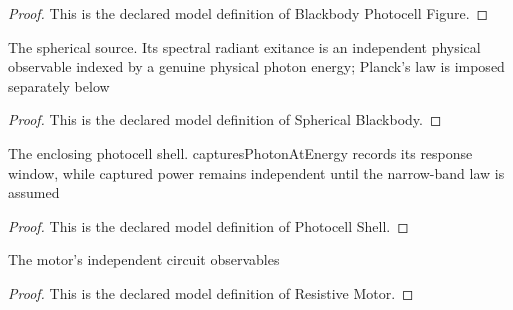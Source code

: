 \begin{proof}
  This is the declared model definition of Blackbody Photocell Figure.
\end{proof}
\begin{definition}
  \label{def:physics:phyx-mini-0614:phyxminiproblems-problemphyxmini0614-sphericalblackbody}
  The spherical source. Its spectral radiant exitance is an independent physical observable indexed by a genuine physical photon energy; Planck's law is imposed separately below
\end{definition}
\begin{proof}
  This is the declared model definition of Spherical Blackbody.
\end{proof}
\begin{definition}
  \label{def:physics:phyx-mini-0614:phyxminiproblems-problemphyxmini0614-photocellshell}
  The enclosing photocell shell. capturesPhotonAtEnergy records its response window, while captured power remains independent until the narrow-band law is assumed
\end{definition}
\begin{proof}
  This is the declared model definition of Photocell Shell.
\end{proof}
\begin{definition}
  \label{def:physics:phyx-mini-0614:phyxminiproblems-problemphyxmini0614-resistivemotor}
  The motor's independent circuit observables
\end{definition}
\begin{proof}
  This is the declared model definition of Resistive Motor.
\end{proof}
